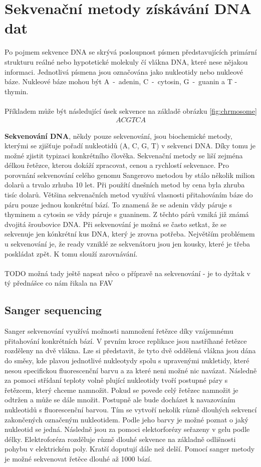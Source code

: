 \documentclass[czech,DP]{thesiskiv}
\numberwithin{equation}{section}
\begin{document}
\chapter{Sekvenační metody získávání DNA dat}
Po pojmem sekvence DNA se skrývá posloupnost písmen představujících primární strukturu reálné nebo hypotetické molekuly čí vlákna DNA, které nese nějakou informaci. Jednotlivá písmena jsou označována jako nukleotidy nebo nukleové báze. Nukleové báze mohou být A~-~adenin, C~-~cytosin, G~-~guanin a T - thymin. \cite{genome_gov}
\\
\\
\noindent
Příkladem může být následující úsek sekvence na základě obrázku \ref{fig:chrmosome} 
\begin{align}
   \label{sekvence_prikad} ACGTCA
\end{align}

\noindent
\textbf{Sekvenování DNA}, někdy pouze sekvenování, jsou biochemické metody, kterými se zjišťuje pořadí nukleotidů (A, C, G, T) v sekvenci DNA. Díky tomu je možné zjistit typizaci konkrétního člověka. Sekvenační metody se liší zejména délkou řetězce, kterou dokáží zpracovat, cenou a rychlostí sekvenace. Pro porovnání sekvenování celého genomu Sangerovo metodou by stálo několik milion dolarů a trvalo zrhuba 10 let. Při použítí dnešních metod by cena byla zhruba tisíc dolarů. Většina sekvenačních metod využívá vlasnosti přitahováním báze do páru pouze jednou konkrétní bází. To znamená že se adenin vždy páruje s thyminem a cytosin se vždy páruje s guaninem. Z těchto párů vzniká již známá dvojitá šroubovice DNA. Při sekvenování je možná se často setkat, že se sekvenuje jen kónkrétní kus DNA, který je zrovna potřeba. Největším problémem u sekvenování je, že ready vzniklé ze sekvenátoru jsou jen kousky, které je třeba poskládat zpět. K tomu slouží zarovnávání. \cite{sekvenovani_ziva}
\\
\\
TODO možná tady ještě napsat něco o přípravě na sekvenování - je to dyžtak v tý přednášce co nám řikala na FAV
\section{Sanger sequencing}
Sanger sekvenování využívá možnosti namnožení řetězce díky vzájemnému přitahování konkrétních bází. V prvním kroce replikace jsou nastříhané řetězce rozděleny na dvě vlákna. Lze si představit, že tyto dvě oddělená vlákna jsou dána do směsy, kde plavou jednotlivé nukleotydy spolu s upravenými nukletidy, které nesou specifickou fluorescenční barvu a za které neni možné nic navázat. Následně za pomoci střídaní teploty volně plující nukleotidy tvoří postupné páry s řetězcem, který chceme namnožit. Pokud se povede celý řetězec namnožit je odtržen a může se dále množit. Postupně ale bude docházet k navazováním nukleotidů s fluorescenční barvou. Tím se vytvoří nekolik různě dlouhých sekvencí zakončených označeným nukleotidem. Podle jeho barvy je možné poznat o jaký nukleotid se jedná. Následně jsou za pomoci elektorforézy seřazeny v gelu podle délky. Elektroforéza rozděluje různě dlouhé sekvence na základně odlišnosti pohybu v elektrickém poly. Kratší doputují dále než delší. Pomocí sanger metody je možné sekvenovat řetěce dlouhé až 1000 bází.   
\end{document}
